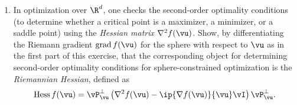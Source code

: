 \documentclass[../../book-main.tex]{subfiles}
\begin{document}
\begin{exercise}
\begin{enumerate}
\begin{equation}
        \mathrm{grad}\, f(\vu) = \vP_{\vu}^\perp \nabla f
        \end{equation}
        is known as the \textit{Riemannian gradient} of the function $f$ restricted to the sphere.
        The \textit{first order optimality conditions} for the optimization problem \eqref{eq:exercise-sphere-constrained-max} can be expressed in terms of the Riemann gradient:
        \begin{equation*}
            \mathrm{grad}\, f(\vu) = \mathbf{0}.
        \end{equation*}
        Geometrically, this says that the Euclidean gradient of $f$ at $\vu$ must be orthogonal to the tangent space to the sphere at $\vu$.
        Now suppose $\vv \in \R^d$ is nonzero. Show that
        \begin{equation*}
            \mathrm{proj}_{\bS^{d-1}}(\vv) \doteq
            \min_{\norm{\vu}_2^2 = 1}\, \norm{\vu - \vv}_2 
            =
            \frac{\vv}{\norm{\vv}_2},
        \end{equation*}
        using the first-order optimality conditions. 
        \item In optimization over $\R^d$, one checks the second-order optimality conditions (to determine whether a critical point is a maximizer, a minimizer, or a saddle point) using the \textit{Hessian matrix} $\nabla^2 f(\vu)$.
        Show, by differentiating the Riemann gradient $\mathrm{grad}\, f(\vu)$ for the sphere with respect to $\vu$ as in the first part of this exercise, that the corresponding object for determining second-order optimality conditions for sphere-constrained optimization is the \textit{Riemannian Hessian}, defined as
        \begin{equation}\label{eq:exercise-riemann-hess-sphere}
            \mathrm{Hess}\, f(\vu) = \vP_{\vu}^\perp \left( 
            \nabla^2 f(\vu) - \ip{\nabla f(\vu)}{\vu} \vI
            \right) \vP_{\vu}^\perp.
        \end{equation}
    \end{enumerate}
\end{exercise}
\end{document}
